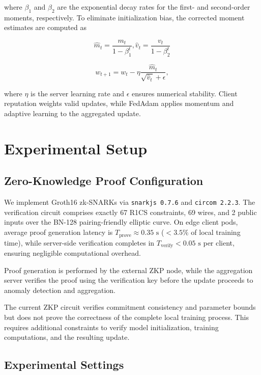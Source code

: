 \documentclass[conference, a4paper]{IEEEtran}
\begin{document}
where $\beta_1$ and $\beta_2$ are the exponential decay rates for
the first- and second-order moments, respectively. To eliminate initialization bias, the corrected moment estimates are
computed as

\begin{equation}
\hat{m}_t=\frac{m_t}{1-\beta_1^t}, \hat{v}_t=\frac{v_t}{1-\beta_2^t}
\end{equation}

\begin{equation}
w_{t+1}=w_t-\eta
\frac{\hat{m}_t}
{\sqrt{\hat{v}_t}+\epsilon},
\end{equation}

where $\eta$ is the server learning rate and $\epsilon$ ensures numerical stability. Client reputation weights valid updates, while FedAdam applies momentum and adaptive learning to the aggregated update.

\section{Experimental Setup}\label{experimentalsetup}

\subsection{Zero-Knowledge Proof Configuration}
We implement Groth16 zk-SNARKs via \texttt{snarkjs 0.7.6} and \texttt{circom 2.2.3}. The verification circuit comprises exactly 67 R1CS constraints, 69 wires, and 2 public inputs over the BN-128 pairing-friendly elliptic curve. On edge client pods, average proof generation latency is $T_{\mathrm{prove}} \approx 0.35\text{ s}$ ($<3.5\%$ of local training time), while server-side verification completes in $T_{\mathrm{verify}} < 0.05\text{ s}$ per client, ensuring negligible computational overhead.

Proof generation is performed by the external ZKP node, while
the aggregation server verifies the proof using the verification
key before the update proceeds to anomaly detection and aggregation. 

The current ZKP circuit verifies commitment consistency and parameter bounds but does not prove the correctness of the complete local training process. This requires additional constraints to verify model initialization, training computations, and the resulting update.

\subsection{Experimental Settings}
\end{document}
